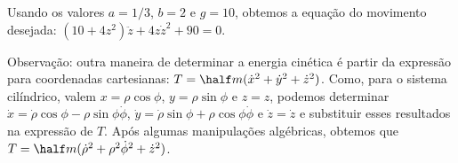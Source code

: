 \begin{question}
\begin{solution}
		Usando os valores $a = 1/3$, $b = 2$ e $g = 10$, obtemos a equação do movimento desejada: %
		$(10 + 4z^2)\ddot z + 4z\dot z^2 + 90 = 0$. %

		Observação: outra maneira de determinar a energia cinética é partir da expressão para coordenadas cartesianas: $T = \half m (\dot x^2 + \dot y^2 + \dot z^2)$.
		Como, para o sistema cilíndrico, valem $x = \rho\cos\phi$, $y = \rho\sin\phi$ e $z = z$, podemos determinar $\dot x = \dot\rho \cos\phi - \rho\sin\phi \dot \phi$, $\dot y = \dot\rho \sin\phi + \rho\cos\phi \dot \phi$ e $\dot z = \dot z$ e substituir esses resultados na expressão de $T$. Após algumas manipulações algébricas, obtemos que $T = \half m (\dot\rho^2 + \rho^2\dot\phi^2 + \dot z^2)$. 
	\end{solution}
\end{question}